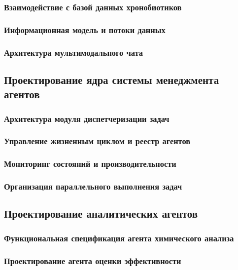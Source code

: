 \documentclass{syksu-coursework}
\begin{document}
\subsubsection{Взаимодействие с базой данных хронобиотиков}

\subsubsection{Информационная модель и потоки данных}

\subsubsection{Архитектура мультимодального чата}

\subsection{Проектирование ядра системы менеджмента агентов}

\subsubsection{Архитектура модуля диспетчеризации задач}

\subsubsection{Управление жизненным циклом и реестр агентов}

\subsubsection{Мониторинг состояний и производительности}

\subsubsection{Организация параллельного выполнения задач}

\subsection{Проектирование аналитических агентов}

\subsubsection{Функциональная спецификация агента химического анализа}

\subsubsection{Проектирование агента оценки эффективности}
\end{document}
